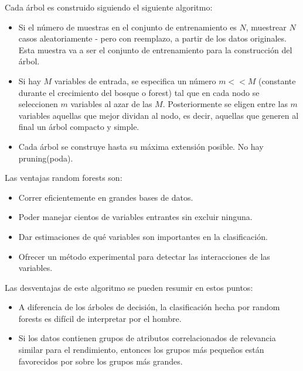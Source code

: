 	Cada árbol es construido siguiendo el siguiente algoritmo:
	\begin{itemize}
		\item Si el número de muestras en el conjunto de entrenamiento es $N$, muestrear $N$ casos aleatoriamente - pero con reemplazo, a partir de los datos originales. Esta muestra va a ser el conjunto de entrenamiento para la construcción del árbol.
		\item Si hay $M$ variables de entrada, se especifica un número $m<<M$ (constante durante el crecimiento del bosque o forest) tal que en cada nodo se seleccionen $m$ variables al azar de las $M$. Posteriormente se eligen entre las $m$ variables aquellas que mejor dividan al nodo, es decir, aquellas que generen al final un árbol compacto y simple.
		\item Cada árbol se construye hasta su máxima extensión posible. No hay pruning(poda).
	\end{itemize}
	Las ventajas random forests son:
	\begin{itemize}
		\item Correr eficientemente en grandes bases de datos.
		\item Poder manejar cientos de variables entrantes sin excluir ninguna.
		\item Dar estimaciones de qué variables son importantes en la clasificación.
		\item Ofrecer un método experimental para detectar las interacciones de las variables.
	\end{itemize}
	Las desventajas de este algoritmo se pueden resumir en estos puntos:
	\begin{itemize}
		\item A diferencia de los árboles de decisión, la clasificación hecha por random forests es difícil de interpretar por el hombre.
		\item Si los datos contienen grupos de atributos correlacionados de relevancia similar para el rendimiento, entonces los grupos más pequeños están favorecidos por sobre los grupos más grandes.
	\end{itemize}
	
